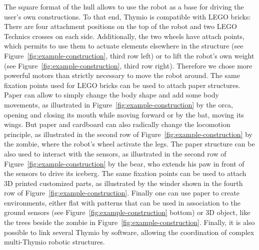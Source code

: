 \documentclass[letterpaper, 10 pt, conference]{ieeeconf}  %
\begin{document}
The square format of the hull allows to use the robot as a base for driving the user's own constructions.
To that end, Thymio is compatible with LEGO bricks:
There are four attachment positions on the top of the robot and two LEGO Technics crosses on each side.
Additionally, the two wheels have attach points, which permits to use them to actuate elements elsewhere in the structure (see Figure~\ref{fig:example-construction}, third row left) or to lift the robot's own weight (see Figure~\ref{fig:example-construction}, third row right).
Therefore we chose more powerful motors than strictly necessary to move the robot around.
The same fixation points used for LEGO bricks can be used to attach paper structures.
Paper can allow to simply change the body shape and add some body movements, as illustrated in Figure~\ref{fig:example-construction} by the orca, opening and closing its mouth while moving forward or by the bat, moving its wings. 
But paper and cardboard can also radically change the locomotion principle, as illustrated in the second row of Figure~\ref{fig:example-construction} by the zombie, where the robot's wheel activate the legs. 
The paper structure can be also used to interact with the sensors, as illustrated in the second row of Figure~\ref{fig:example-construction} by the bear, who extends his paw in front of the sensors to drive its iceberg.
The same fixation points can be used to attach 3D printed customized parts, as illustrated by the winder shown in the fourth row of Figure~\ref{fig:example-construction}.
Finally one can use paper to create environments, either flat with patterns that can be used in association to the ground sensors (see Figure~\ref{fig:example-construction} bottom) or 3D object, like the trees beside the zombie in Figure~\ref{fig:example-construction}.
Finally, it is also possible to link several Thymio by software, allowing the coordination of complex multi-Thymio robotic structures.
\end{document}

